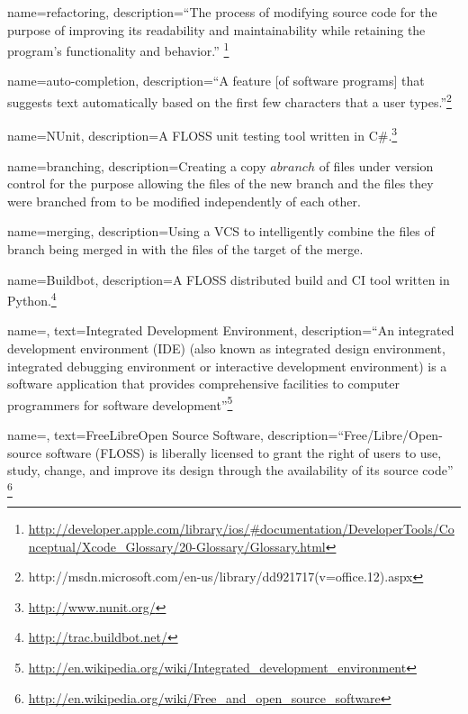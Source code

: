 
{
name=refactoring,
description={``The process of modifying source code for the purpose of improving its readability and maintainability while retaining the program's functionality and behavior.'' \footnote{\url{http://developer.apple.com/library/ios/\#documentation/DeveloperTools/Conceptual/Xcode_Glossary/20-Glossary/Glossary.html}}}
}

{
name=auto-completion,
description={``A feature {[}of software programs{]} that suggests text automatically based on the first few characters that a user types.''\footnote{http://msdn.microsoft.com/en-us/library/dd921717(v=office.12).aspx}}
}

{
name=NUnit,
description={A \gls{FLOSS} unit testing tool written in C\#.\footnote{\url{http://www.nunit.org/}}}
}

{
name=branching,
description={Creating a copy \(a branch\) of files under version control for the purpose allowing the files of the new branch and the files they were branched from to be modified independently of each other.
}
}

{
name=merging,
description={Using a \gls{VCS} to intelligently combine the files of branch being merged in with the files of the target of the merge.
}
}

{
name=Buildbot,
description={A \gls{FLOSS} distributed build and \gls{CI} tool written in Python.\footnote{\url{http://trac.buildbot.net/}}}
}




{
name=,
text=Integrated Development Environment,
description={``An integrated development environment (IDE) (also known as integrated design environment, integrated debugging environment or interactive development environment) is a software application that provides comprehensive facilities to computer programmers for software development''\footnote{\url{http://en.wikipedia.org/wiki/Integrated_development_environment}}}
}	


{
name=,
text=Free\/\-Libre\/\-Open Source Software,
description={``Free/\-Libre/\-Open-\-source software (FLOSS) is liberally licensed to grant the right of users to use, study, change, and improve its design through the availability of its source code'' \footnote{\url{http://en.wikipedia.org/wiki/Free_and_open_source_software}}}
}

